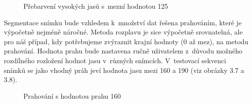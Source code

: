 \documentclass[12pt, a4paper]{report}
\begin{document}
	\begin{figure}[!htb]
	\centering
	\label{fig:jas_0_125}
	\caption{Přebarvení vysokých jasů s~mezní hodnotou 125}
	\end{figure}				
		
	Segmentace snímku bude vzhledem k~množství dat řešena prahováním, které je výpočetně nejméně náročné. Metoda rozplavu je sice výpočetně srovnatelná, ale pro náš případ, kdy potřebujeme zvýraznit krajní hodnoty (0 až mez),  na metodu prahování. Hodnota prahu bude nastavena ručně uživatelem z~důvodu možného rozdílného rozložení hodnot jasu v~různých snímcích. V~testovací sekvenci snímků se jako vhodný práh jeví hodnota jasu mezi 160 a 190 (viz obrázky 3.7 a 3.8).
	
	\begin{figure}[!htb]
	\centering
	\label{fig:prahovani_160}
	\caption{Prahování s hodnotou prahu 160}
	\end{figure}
	
\end{document}
